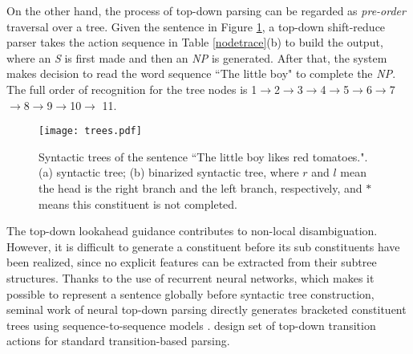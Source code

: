 \documentclass[11pt,letterpaper]{article}
\begin{document}
On the other hand, the process of top-down parsing can be regarded as \textit{pre-order} traversal over a tree.
Given the sentence in Figure \ref{trees}, a top-down shift-reduce parser takes the action sequence in Table \ref{nodetrace}(b) to build the output, where an \textit{S} is first made and then an \textit{NP} is generated.
After that, the system makes decision to read the word sequence ``The little boy" to complete the \textit{NP}.
The full order of recognition for the tree nodes is \textcircled{\scriptsize{1}}$\rightarrow$\textcircled{\scriptsize{2}}$\rightarrow$\textcircled{\scriptsize{3}}$\rightarrow$\textcircled{\scriptsize{4}}$\rightarrow$\textcircled{\scriptsize{5}}$\rightarrow$\textcircled{\scriptsize{6}}$\rightarrow$\textcircled{\scriptsize{7}}$\rightarrow$\textcircled{\scriptsize{8}}$\rightarrow$\textcircled{\scriptsize{9}}$\rightarrow$\textcircled{\scriptsize{10}}$\rightarrow$ \textcircled{\scriptsize{11}}.
\begin{figure}
\begin{center}
\texttt{[image: trees.pdf]}
\end{center}
\caption{\label{trees} Syntactic trees of the sentence ``The little boy likes red tomatoes.". (a) syntactic tree; (b) binarized syntactic tree, where $r$ and $l$ mean the head is the right branch and the left branch, respectively, and $*$ means this constituent is not completed.}
\end{figure}
The top-down lookahead guidance contributes to non-local disambiguation.
However, it is difficult to generate a constituent before its sub constituents have been realized, since no explicit features can be extracted from their subtree structures.
Thanks to the use of recurrent neural networks, which makes it possible to represent a sentence globally before syntactic tree construction, seminal work of neural top-down parsing directly generates bracketed constituent trees using sequence-to-sequence models \cite{vinyals:2015}.
 design set of top-down transition actions for standard transition-based parsing.
\end{document}
